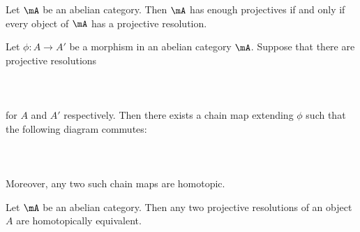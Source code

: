\documentclass[a4paper]{article}
\begin{document}
\begin{prp}{}{} Let $\mA$ be an abelian category. Then $\mA$ has enough projectives if and only if every object of $\mA$ has a projective resolution. 
\end{prp}

\begin{prp}{}{} Let $\phi:A\to A'$ be a morphism in an abelian category $\mA$. Suppose that there are projective resolutions \\~\\
\\~\\
for $A$ and $A'$ respectively. Then there exists a chain map extending $\phi$ such that the following diagram commutes: \\~\\
\\~\\
Moreover, any two such chain maps are homotopic. 
\end{prp}

\begin{lmm}{}{} Let $\mA$ be an abelian category. Then any two projective resolutions of an object $A$ are homotopically equivalent. 
\end{lmm}
\end{document}
